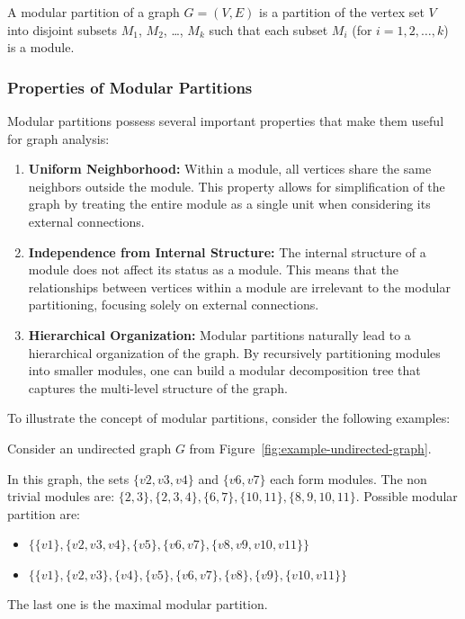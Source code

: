 \begin{mydef}
    A modular partition of a graph $G = (V, E)$ is a partition of the vertex set $V$ into disjoint subsets $M_1$, $M_2$, \ldots, $M_k$ such that each subset $M_i$ (for $i = 1, 2, \ldots, k$) is a module.
\end{mydef}

\subsubsection*{Properties of Modular Partitions}

Modular partitions possess several important properties that make them useful for graph analysis:

\begin{enumerate}
    \item \textbf{Uniform Neighborhood:} Within a module, all vertices share the same neighbors outside the module.
    This property allows for simplification of the graph by treating the entire module as a single unit when considering its external connections.
    \item \textbf{Independence from Internal Structure:} The internal structure of a module does not affect its status as a module.
    This means that the relationships between vertices within a module are irrelevant to the modular partitioning, focusing solely on external connections.
    \item \textbf{Hierarchical Organization:} Modular partitions naturally lead to a hierarchical organization of the graph.
    By recursively partitioning modules into smaller modules, one can build a modular decomposition tree that captures the multi-level structure of the graph.
\end{enumerate}

To illustrate the concept of modular partitions, consider the following examples:

\begin{myex}
    Consider an undirected graph $G$ from Figure~\ref{fig:example-undirected-graph}.

    In this graph, the sets $\{v2, v3, v4\}$ and $\{v6, v7\}$ each form modules.
    The non trivial modules are: $\{2, 3\}, \{2, 3, 4\}, \{6, 7\}, \{10, 11\}, \{8, 9, 10, 11\}$.
    Possible modular partition are:
    \begin{itemize}
        \item $\{\{v1\}, \{v2, v3, v4\}, \{v5\}, \{v6, v7\}, \{v8, v9, v10, v11\}\}$
        \item $\{\{v1\}, \{v2, v3\}, \{v4\}, \{v5\}, \{v6, v7\}, \{v8\}, \{v9\}, \{v10, v11\}\}$
    \end{itemize}
    The last one is the maximal modular partition.
\end{myex}


